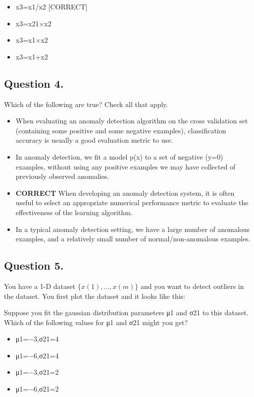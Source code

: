 \begin{itemize}
\item x3=x1/x2 [CORRECT]

\item x3=x21×x2

\item x3=x1×x2

\item  x3=x1+x2

\end{itemize}

\subsection*{Question 4. }
Which of the following are true? Check all that apply.

\begin{itemize}
\item When evaluating an anomaly detection algorithm on the cross validation set (containing some positive and some negative examples), classification accuracy is usually a good evaluation metric to use.
\item  In anomaly detection, we fit a model p(x) to a set of negative (y=0) examples, without using any positive examples we may have collected of previously observed anomalies.
\item \textbf{CORRECT} When developing an anomaly detection system, it is often useful to select an appropriate numerical performance metric to evaluate the effectiveness of the learning algorithm.
\item In a typical anomaly detection setting, we have a large number of anomalous examples, and a relatively small number of normal/non-anomalous examples.
\end{itemize}
\subsection*{Question 5. }
You have a 1-D dataset $\{x(1),\ldots,x(m)\}$ and you want to detect outliers in the dataset. You first plot the dataset and it looks like this:


Suppose you fit the gaussian distribution parameters μ1 and σ21 to this dataset. Which of the following values for μ1 and σ21 might you get?
\begin{itemize}
\item μ1=−3,σ21=4
\item 
μ1=−6,σ21=4
\item
μ1=−3,σ21=2
\item 
μ1=−6,σ21=2
\end{itemize}



